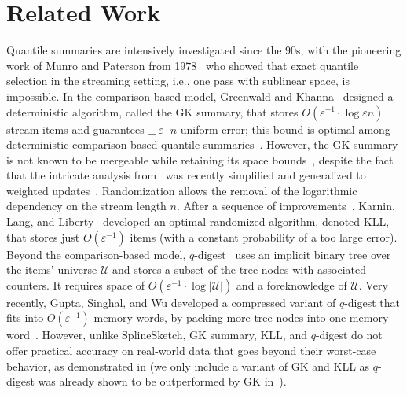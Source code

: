 \documentclass[acmsmall]{acmart}
\newcommand{\eps}{\varepsilon}
\theoremstyle{remark}
\begin{document}
	





\section{Related Work}\label{sec:related}

Quantile summaries are intensively investigated since the 90s, with the pioneering work of Munro and Paterson from 1978~\cite{MunroP80} who showed that exact quantile selection in the streaming setting, i.e., one pass with sublinear space, is impossible. 
In the comparison-based model, Greenwald and Khanna~\cite{greenwald2001space}
designed a deterministic algorithm, called the GK summary, that stores $O(\eps^{-1}\cdot \log \eps n)$ stream items and guarantees $\pm\, \eps\cdot n$ uniform error;
this bound is optimal among deterministic comparison-based quantile summaries~\cite{CormodeV20}.
However, the GK summary is not known to be mergeable while retaining its space bounds~\cite{AgarwalCHPWY13},
despite the fact that the intricate analysis from~\cite{greenwald2001space} was recently simplified and generalized to weighted updates~\cite{AssadiJPS23-GK_weighted,GribelyukSWY24_GK-KG_sketch}.
Randomization allows the removal of the logarithmic dependency on the stream length $n$. 
After a sequence of improvements~\cite{manku1999random,luo16_quantiles_experimental,felber2015randomized}, Karnin, Lang, and Liberty~\cite{KarninLL16} developed an optimal randomized algorithm, denoted KLL, that stores just $O(\eps^{-1})$ items (with a constant probability of a too large error).
Beyond the comparison-based model, 
$q$-digest~\cite{shrivastava2004medians} 
uses an implicit binary tree over the items' universe $\mathcal{U}$ and stores a subset of the tree nodes with associated counters.
It requires space of $O(\eps^{-1}\cdot \log |\mathcal{U}|)$ and a foreknowledge of $\mathcal{U}$.
Very recently, Gupta, Singhal, and Wu developed a compressed variant of $q$-digest that fits into $O(\eps^{-1})$ memory words, by packing more tree nodes into one memory word~\cite{GuptaSW24optimaQS-non-comp}.
However, unlike SplineSketch, GK summary, KLL, and $q$-digest do not offer practical accuracy on real-world data that goes beyond their worst-case behavior,
as demonstrated in  (we only include a variant of GK and KLL as $q$-digest was already shown to be outperformed by GK in~\cite{luo16_quantiles_experimental}).
\end{document}
